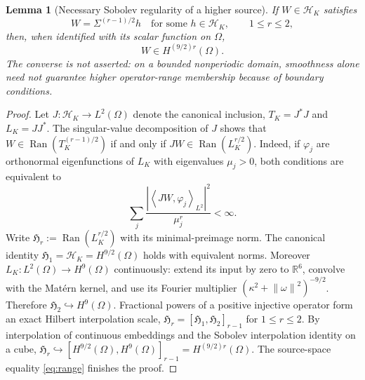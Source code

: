 \documentclass[11pt,a4paper]{article}
\newtheorem{lemma}[theorem]{Lemma}
\theoremstyle{remark}
\newcommand{\R}{\mathbb R}
\newcommand{\Hh}{\mathcal H_K}
\newcommand{\Ran}{\operatorname{Ran}}
\newcommand{\norm}[1]{\left\lVert#1\right\rVert}
\newcommand{\ip}[2]{\left\langle#1,#2\right\rangle}
\begin{document}
\begin{lemma}[Necessary Sobolev regularity of a higher source]\label{lem:necessary}
If $W\in\Hh$ satisfies
\begin{equation}\label{eq:source}
 W=\Sigma^{(r-1)/2}h\quad\text{for some }h\in\Hh,\qquad 1\le r\le2,
\end{equation}
then, when identified with its scalar function on $\Omega$,
\begin{equation}\label{eq:highsob}
 W\in H^{(9/2)r}(\Omega).
\end{equation}
The converse is not asserted: on a bounded nonperiodic domain, smoothness alone need not guarantee higher operator-range membership because of boundary conditions.
\end{lemma}
\begin{proof}
Let $J:\Hh\to L^2(\Omega)$ denote the canonical inclusion, $T_K=J^*J$ and $L_K=JJ^*$. The singular-value decomposition of $J$ shows that
$W\in\Ran(T_K^{(r-1)/2})$ if and only if
$JW\in\Ran(L_K^{r/2})$. Indeed, if $\varphi_j$ are orthonormal eigenfunctions of $L_K$ with eigenvalues $\mu_j>0$, both conditions are equivalent to
\begin{equation}\label{eq:sourcecoeff}
 \sum_j\frac{|\ip{JW}{\varphi_j}_{L^2}|^2}{\mu_j^{r}}<\infty.
\end{equation}
Write $\mathfrak H_r:=\Ran(L_K^{r/2})$ with its minimal-preimage norm. The canonical identity $\mathfrak H_1=\Hh=H^{9/2}(\Omega)$ holds with equivalent norms. Moreover $L_K:L^2(\Omega)\to H^9(\Omega)$ continuously: extend its input by zero to $\R^6$, convolve with the Mat\'ern kernel, and use its Fourier multiplier $(\kappa^2+\norm{\omega}^2)^{-9/2}$. Therefore $\mathfrak H_2\hookrightarrow H^9(\Omega)$. Fractional powers of a positive injective operator form an exact Hilbert interpolation scale,
$\mathfrak H_r=[\mathfrak H_1,\mathfrak H_2]_{r-1}$ for $1\le r\le2$. By interpolation of continuous embeddings and the Sobolev interpolation identity on a cube,
$\mathfrak H_r\hookrightarrow[H^{9/2}(\Omega),H^9(\Omega)]_{r-1}
=H^{(9/2)r}(\Omega)$.
The source-space equality \eqref{eq:range} finishes the proof.
\end{proof}
\end{document}
